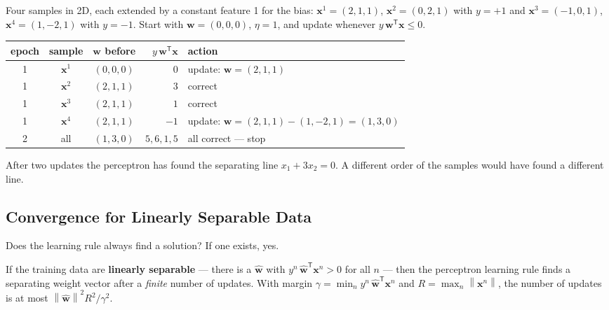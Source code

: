\documentclass[11pt, oneside]{book}
\newcommand{\norm}[1]{\left\lVert #1 \right\rVert}
\newcommand{\T}{^{\mathsf{T}}}           %
\newcommand{\bx}{\bm{x}}        \newcommand{\by}{\bm{y}}
\newcommand{\bw}{\bm{w}}        \newcommand{\bW}{\bm{W}}
\newcommand{\what}{\hat{\bm{w}}}
\let\originalsubsection\subsection
\renewcommand{\subsection}{\Needspace{6\baselineskip}\originalsubsection}
\begin{document}
\begin{exbox}[title={Running the perceptron by hand}]
Four samples in 2D, each extended by a constant feature 1 for the bias:
$\bx^1 = (2, 1, 1)$, $\bx^2 = (0, 2, 1)$ with $y = +1$ and
$\bx^3 = (-1, 0, 1)$, $\bx^4 = (1, -2, 1)$ with $y = -1$. Start with
$\bw = (0, 0, 0)$, $\eta = 1$, and update whenever $y\,\bw\T\bx \le 0$.

\medskip
\centering
\begin{tabular}{@{}cccrl@{}}
\toprule
epoch & sample & $\bw$ before & $y\,\bw\T\bx$ & action \\
\midrule
1 & $\bx^1$ & $(0, 0, 0)$ & $0$  & update: $\bw = (2, 1, 1)$ \\
1 & $\bx^2$ & $(2, 1, 1)$ & $3$  & correct \\
1 & $\bx^3$ & $(2, 1, 1)$ & $1$  & correct \\
1 & $\bx^4$ & $(2, 1, 1)$ & $-1$ & update: $\bw = (2,1,1) - (1,-2,1) = (1, 3, 0)$ \\
2 & all     & $(1, 3, 0)$ & $5, 6, 1, 5$ & all correct --- stop \\
\bottomrule
\end{tabular}

\raggedright
\smallskip
After two updates the perceptron has found the separating line
$x_1 + 3x_2 = 0$. A different order of the samples would have found a
different line.
\end{exbox}

\subsection{Convergence for Linearly Separable Data}

Does the learning rule always find a solution? If one exists, yes.

\begin{thmbox}[title={Perceptron convergence theorem}, unbreakable]
If the training data are \textbf{linearly separable} --- there is a $\what$
with $y^n\,\what\T\bx^n > 0$ for all $n$ --- then the perceptron learning rule
finds a separating weight vector after a \emph{finite} number of updates.
With margin $\gamma = \min_n y^n\,\what\T\bx^n$ and $R = \max_n\norm{\bx^n}$,
the number of updates is at most $\norm{\what}^2 R^2 / \gamma^2$.
\end{thmbox}
\end{document}
